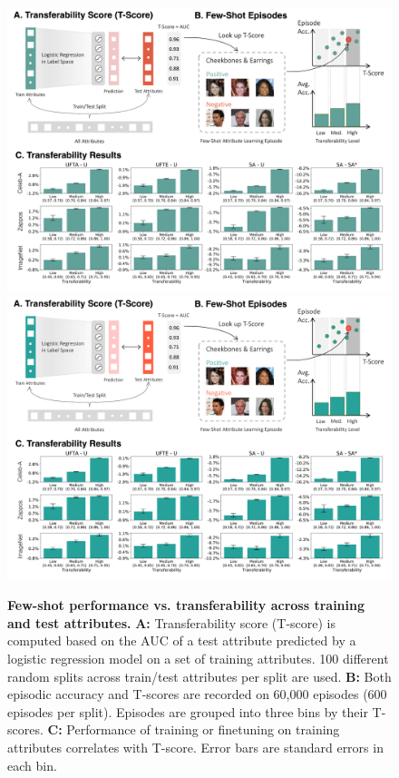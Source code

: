 \begin{figure}[t]
\savespacefigtop{-0.5in}
\centering
\iflatexml
\includegraphics[width=6\textwidth]{./figures/transferability_combo.png}
\else
\includegraphics[width=\textwidth]{./figures/transferability_combo.pdf}
\fi
\savespacebeforesection
\savespacebeforesection
\savespacebeforesection
\caption{
\textbf{Few-shot performance vs. transferability across training and test
attributes.} \textbf{A:} Transferability score (T-score) is computed based on
the AUC of a test attribute predicted by a logistic regression model on a set
of training attributes. 100 different random splits across train/test
attributes per split are used. \textbf{B:} Both episodic accuracy and T-scores
are recorded on 60,000 episodes (600 episodes per split). Episodes are grouped
into three bins by their T-scores. \textbf{C:} Performance of training or
finetuning on training attributes correlates with T-score. Error bars are
standard errors in each bin.}
\label{fig:transfer}
\savespacebeforesection
\savespacebeforesection
\end{figure}

